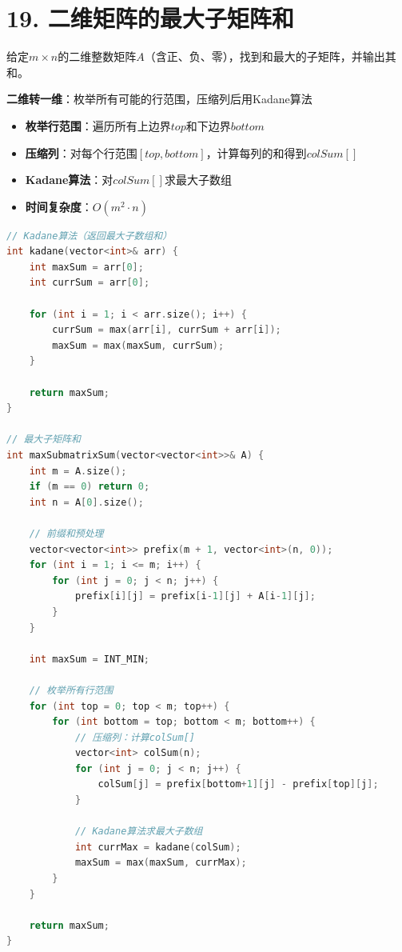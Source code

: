 \section*{19. 二维矩阵的最大子矩阵和}

给定$m \times n$的二维整数矩阵$A$（含正、负、零），找到和最大的子矩阵，并输出其和。



\textbf{二维转一维}：枚举所有可能的行范围，压缩列后用Kadane算法
\begin{itemize}
    \item \textbf{枚举行范围}：遍历所有上边界$top$和下边界$bottom$
    \item \textbf{压缩列}：对每个行范围$[top, bottom]$，计算每列的和得到$colSum[]$
    \item \textbf{Kadane算法}：对$colSum[]$求最大子数组
    \item \textbf{时间复杂度}：$O(m^2 \cdot n)$
\end{itemize}
\begin{lstlisting}[language=C++, style=cppstyle]
// Kadane算法（返回最大子数组和）
int kadane(vector<int>& arr) {
    int maxSum = arr[0];
    int currSum = arr[0];

    for (int i = 1; i < arr.size(); i++) {
        currSum = max(arr[i], currSum + arr[i]);
        maxSum = max(maxSum, currSum);
    }

    return maxSum;
}

// 最大子矩阵和
int maxSubmatrixSum(vector<vector<int>>& A) {
    int m = A.size();
    if (m == 0) return 0;
    int n = A[0].size();

    // 前缀和预处理
    vector<vector<int>> prefix(m + 1, vector<int>(n, 0));
    for (int i = 1; i <= m; i++) {
        for (int j = 0; j < n; j++) {
            prefix[i][j] = prefix[i-1][j] + A[i-1][j];
        }
    }

    int maxSum = INT_MIN;

    // 枚举所有行范围
    for (int top = 0; top < m; top++) {
        for (int bottom = top; bottom < m; bottom++) {
            // 压缩列：计算colSum[]
            vector<int> colSum(n);
            for (int j = 0; j < n; j++) {
                colSum[j] = prefix[bottom+1][j] - prefix[top][j];
            }

            // Kadane算法求最大子数组
            int currMax = kadane(colSum);
            maxSum = max(maxSum, currMax);
        }
    }

    return maxSum;
}
\end{lstlisting}


